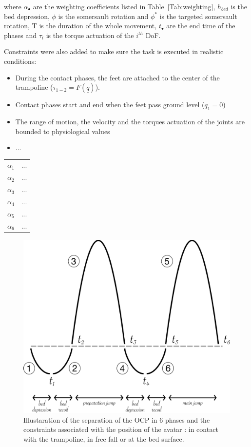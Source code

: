 \noindent where $\alpha_\bullet$ are the weighting coefficients listed in Table~\ref{Tab:weighting}, $h_{bed}$ is the bed depression, $\phi$ is the somersault rotation and $\phi^*$ is the targeted somersault rotation, T is the duration of the whole movement, $t_{\bullet}$ are the end time of the phases and $\tau_i$ is the torque actuation of the $i^{th}$ DoF.


Constraints were also added to make sure the task is executed in realistic conditions: 
\begin{itemize}
\item During the contact phases, the feet are attached to the center of the trampoline ($\tau_{1-2} = F(\underline{q})$).
\item Contact phases start and end when the feet pass ground level ($q_1 = 0$)
\item The range of motion, the velocity and the torques actuation of the joints are bounded to physiological values
\item ...
\end{itemize}


\begin{center}
\begin{tabular}{ c c }
 $\alpha_1$ & ... \\ 
 $\alpha_2$ & ... \\ 
 $\alpha_3$ & ... \\ 
 $\alpha_4$ & ... \\ 
 $\alpha_5$ & ... \\ 
 $\alpha_6$ & ...
\end{tabular}
\label{Tab:weighting}
\end{center}


\begin{figure}[h!]
\centering
\includegraphics[width=0.5\linewidth]{figures/Model_phases.png}
\caption{Illustaration of the separation of the OCP in 6 phases and the constraints associated with the position of the avatar : in contact with the trampoline, in free fall or at the bed surface.}
\label{fig:Model_phases}
\end{figure}


